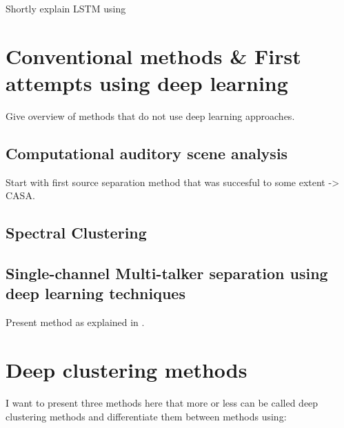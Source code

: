 Shortly explain LSTM using \cite{Hochreiter:1997:LSM:1246443.1246450}




\section{Conventional methods \& First attempts using deep learning} %
\label{sec:conventional_methods}

Give overview of methods that do not use deep learning approaches.

\subsection{Computational auditory scene analysis} %
\label{sub:computational_auditory_scene_analysis}

Start with first source separation method that was succesful to some extent -> CASA.


\subsection{Spectral Clustering} %
\label{sub:spectral_clustering}


\subsection{Single-channel Multi-talker separation using deep learning techniques} %
\label{sub:single_channel_multi_talker_separation_using_deep_learning_techniques}

Present method as explained in \cite{SpeechSepDeepLearning:2015}.



\section{Deep clustering methods} %
\label{sec:deep_clustering_methods}

I want to present three methods here that more or less can be called deep 
clustering methods and differentiate them between methods using:

